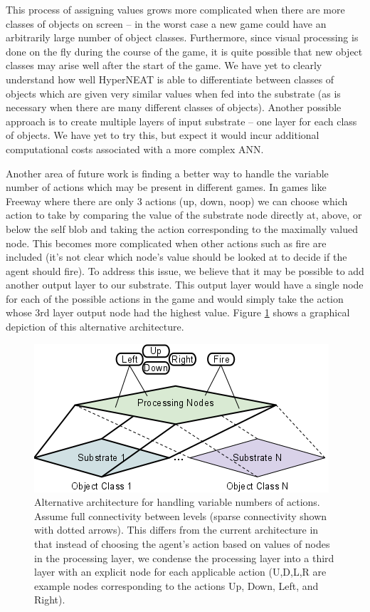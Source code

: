 \documentclass{acm_proc_article-sp}
\begin{document}
This process of assigning values grows more complicated when there are more classes of objects on screen -- in the worst case a new game could have an arbitrarily large number of object classes. Furthermore, since visual processing is done on the fly during the course of the game, it is quite possible that new object classes may arise well after the start of the game. We have yet to clearly understand how well HyperNEAT is able to differentiate between classes of objects which are given very similar values when fed into the substrate (as is necessary when there are many different classes of objects). Another possible approach is to create multiple layers of input substrate -- one layer for each class of objects. We have yet to try this, but expect it would incur additional computational costs associated with a more complex ANN.

Another area of future work is finding a better way to handle the variable number of actions which may be present in different games. In games like Freeway where there are only 3 actions (up, down, noop) we can choose which action to take by comparing the value of the substrate node directly at, above, or below the self blob and taking the action corresponding to the maximally valued node. This becomes more complicated when other actions such as fire are included (it's not clear which node's value should be looked at to decide if the agent should fire). To address this issue, we believe that it may be possible to add another output layer to our substrate. This output layer would have a single node for each of the possible actions in the game and would simply take the action whose 3rd layer output node had the highest value. Figure \ref{fig:possiblearch} shows a graphical depiction of this alternative architecture.

\begin{figure}[htp]
\begin{center}
\includegraphics[width=\columnwidth]{figures/multiple-substrate.png}
\end{center}
\caption{Alternative architecture for handling variable numbers of actions. Assume full connectivity between levels (sparse connectivity shown with dotted arrows). This differs from the current architecture in that instead of choosing the agent's action based on values of nodes in the processing layer, we condense the processing layer into a third layer with an explicit node for each applicable action (U,D,L,R are example nodes corresponding to the actions Up, Down, Left, and Right).}
\label{fig:possiblearch}
\end{figure}
\end{document}
